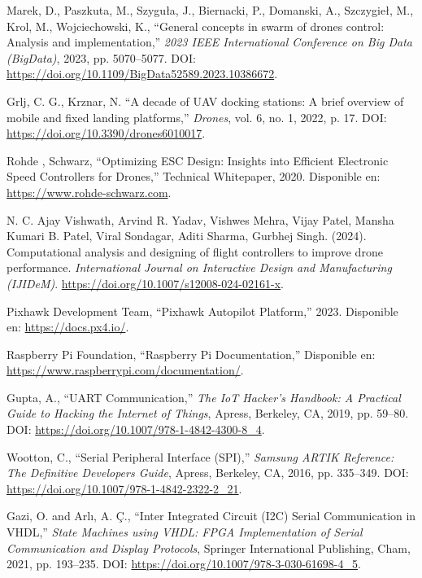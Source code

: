 \begin{thebibliography}{30}
    Marek, D., Paszkuta, M., Szyguła, J., Biernacki, P., Domanski, A., Szczygieł, M., Krol, M., Wojciechowski, K., ``General concepts in swarm of drones control: Analysis and implementation,'' \textit{2023 IEEE International Conference on Big Data (BigData)}, 2023, pp. 5070--5077. DOI: \url{https://doi.org/10.1109/BigData52589.2023.10386672}.



    Grlj, C. G., Krznar, N. ``A decade of UAV docking stations: A brief overview of mobile and fixed landing platforms,'' \textit{Drones}, vol. 6, no. 1, 2022, p. 17. DOI: \url{https://doi.org/10.3390/drones6010017}.

    

    Rohde , Schwarz, ``Optimizing ESC Design: Insights into Efficient Electronic Speed Controllers for Drones,'' Technical Whitepaper, 2020. Disponible en: \url{https://www.rohde-schwarz.com}. 

    N. C. Ajay Vishwath, Arvind R. Yadav, Vishwes Mehra, Vijay Patel, Mansha Kumari B. Patel, Viral Sondagar, Aditi Sharma, Gurbhej Singh. (2024). Computational analysis and designing of flight controllers to improve drone performance. \textit{International Journal on Interactive Design and Manufacturing (IJIDeM)}. \url{https://doi.org/10.1007/s12008-024-02161-x}.

    Pixhawk Development Team, ``Pixhawk Autopilot Platform,'' 2023. Disponible en: \url{https://docs.px4.io/}. 

    Raspberry Pi Foundation, ``Raspberry Pi Documentation,'' Disponible en: \url{https://www.raspberrypi.com/documentation/}. 

    Gupta, A., ``UART Communication,'' \textit{The IoT Hacker's Handbook: A Practical Guide to Hacking the Internet of Things}, Apress, Berkeley, CA, 2019, pp. 59--80. DOI: \url{https://doi.org/10.1007/978-1-4842-4300-8_4}.

    Wootton, C., ``Serial Peripheral Interface (SPI),'' \textit{Samsung ARTIK Reference: The Definitive Developers Guide}, Apress, Berkeley, CA, 2016, pp. 335--349. DOI: \url{https://doi.org/10.1007/978-1-4842-2322-2_21}.

    Gazi, O. and Arlı, A. Ç., ``Inter Integrated Circuit (I2C) Serial Communication in VHDL,'' \textit{State Machines using VHDL: FPGA Implementation of Serial Communication and Display Protocols}, Springer International Publishing, Cham, 2021, pp. 193--235. DOI: \url{https://doi.org/10.1007/978-3-030-61698-4_5}.


\end{thebibliography}
